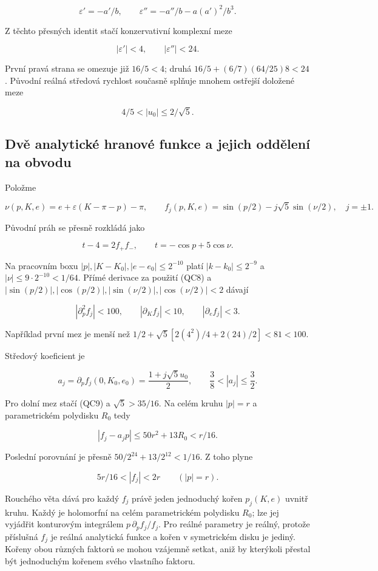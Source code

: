 \documentclass[11pt,a4paper]{article}
\theoremstyle{remark}\newtheorem{remark}[theorem]{Poznámka}
\numberwithin{equation}{section}
\begin{document}
\[
\varepsilon'=-a'/b,\qquad
\varepsilon''=-a''/b-a(a')^2/b^3.
\]

Z těchto přesných identit stačí konzervativní komplexní meze

\[
\boxed{|\varepsilon'|<4,\qquad |\varepsilon''|<24.}
\tag{QC8}
\]

První pravá strana se omezuje již \(16/5<4\); druhá
\(16/5+(6/7)(64/25)8<24\). Původní reálná středová rychlost současně
splňuje mnohem ostřejší doložené meze

\[
4/5<|u_0|\le2/\sqrt5.
\tag{QC9}
\]

\hypertarget{dvux11b-analytickuxe9-hranovuxe9-funkce-a-jejich-oddux11blenuxed-na-obvodu}{%
\subsection{Dvě analytické hranové funkce a jejich oddělení na
obvodu}\label{dvux11b-analytickuxe9-hranovuxe9-funkce-a-jejich-oddux11blenuxed-na-obvodu}}

Položme

\[
\nu(p,K,e)=e+\varepsilon(K-\pi-p)-\pi,
\qquad
f_j(p,K,e)=\sin(p/2)-j\sqrt5\sin(\nu/2),\quad j=\pm1.
\]

Původní práh se přesně rozkládá jako

\[
t-4=2f_+f_-,\qquad t=-\cos p+5\cos\nu.
\tag{QC10}
\]

Na pracovním boxu \(|p|,|K-K_0|,|e-e_0|\le2^{-10}\) platí
\(|k-k_0|\le2^{-9}\) a \(|\nu|\le9\cdot2^{-10}<1/64\). Přímé derivace za
použití (QC8) a
\(|\sin(p/2)|,|\cos(p/2)|,|\sin(\nu/2)|,|\cos(\nu/2)|<2\) dávají

\[
|\partial_p^2 f_j|<100,\qquad
|\partial_Kf_j|<10,\qquad |\partial_ef_j|<3.
\tag{QC11}
\]

Například první mez je menší než
\(1/2+\sqrt5[2(4^2)/4+2(24)/2]<81<100\).

Středový koeficient je

\[
a_j=\partial_pf_j(0,K_0,e_0)=\frac{1+j\sqrt5u_0}{2},
\qquad \frac38<|a_j|\le\frac32.
\tag{QC12}
\]

Pro dolní mez stačí (QC9) a \(\sqrt5>35/16\). Na celém kruhu \(|p|=r\) a
parametrickém polydisku \(R_0\) tedy

\[
|f_j-a_jp|\le50r^2+13R_0<r/16.
\tag{QC13}
\]

Poslední porovnání je přesně \(50/2^{24}+13/2^{12}<1/16\). Z toho plyne

\[
\boxed{5r/16<|f_j|<2r\qquad(|p|=r).}
\tag{QC14}
\]

Rouchého věta dává pro každý \(f_j\) právě jeden jednoduchý kořen
\(p_j(K,e)\) uvnitř kruhu. Každý je holomorfní na celém parametrickém
polydisku \(R_0\); lze jej vyjádřit konturovým integrálem
\(p\,\partial_pf_j/f_j\). Pro reálné parametry je reálný, protože
příslušná \(f_j\) je reálná analytická funkce a kořen v symetrickém
disku je jediný. Kořeny obou různých faktorů se mohou vzájemně setkat,
aniž by kterýkoli přestal být jednoduchým kořenem svého vlastního
faktoru.
\end{document}
